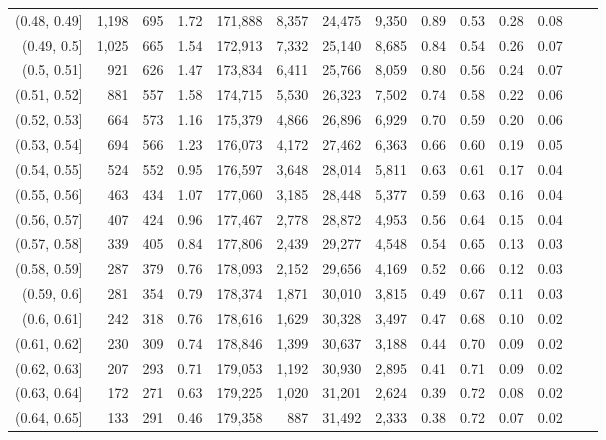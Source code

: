 \begin{tabular}{rrrrrrrrrrrrrr}
(0.48, 0.49]   &  1,198 &  695 &    1.72 &  171,888 &    8,357 &  24,475 &   9,350 &  0.89 &  0.53 &  0.28 &      0.08 \\
(0.49, 0.5]    &  1,025 &  665 &    1.54 &  172,913 &    7,332 &  25,140 &   8,685 &  0.84 &  0.54 &  0.26 &      0.07 \\
(0.5, 0.51]    &    921 &  626 &    1.47 &  173,834 &    6,411 &  25,766 &   8,059 &  0.80 &  0.56 &  0.24 &      0.07 \\
(0.51, 0.52]   &    881 &  557 &    1.58 &  174,715 &    5,530 &  26,323 &   7,502 &  0.74 &  0.58 &  0.22 &      0.06 \\
(0.52, 0.53]   &    664 &  573 &    1.16 &  175,379 &    4,866 &  26,896 &   6,929 &  0.70 &  0.59 &  0.20 &      0.06 \\
(0.53, 0.54]   &    694 &  566 &    1.23 &  176,073 &    4,172 &  27,462 &   6,363 &  0.66 &  0.60 &  0.19 &      0.05 \\
(0.54, 0.55]   &    524 &  552 &    0.95 &  176,597 &    3,648 &  28,014 &   5,811 &  0.63 &  0.61 &  0.17 &      0.04 \\
(0.55, 0.56]   &    463 &  434 &    1.07 &  177,060 &    3,185 &  28,448 &   5,377 &  0.59 &  0.63 &  0.16 &      0.04 \\
(0.56, 0.57]   &    407 &  424 &    0.96 &  177,467 &    2,778 &  28,872 &   4,953 &  0.56 &  0.64 &  0.15 &      0.04 \\
(0.57, 0.58]   &    339 &  405 &    0.84 &  177,806 &    2,439 &  29,277 &   4,548 &  0.54 &  0.65 &  0.13 &      0.03 \\
(0.58, 0.59]   &    287 &  379 &    0.76 &  178,093 &    2,152 &  29,656 &   4,169 &  0.52 &  0.66 &  0.12 &      0.03 \\
(0.59, 0.6]    &    281 &  354 &    0.79 &  178,374 &    1,871 &  30,010 &   3,815 &  0.49 &  0.67 &  0.11 &      0.03 \\
(0.6, 0.61]    &    242 &  318 &    0.76 &  178,616 &    1,629 &  30,328 &   3,497 &  0.47 &  0.68 &  0.10 &      0.02 \\
(0.61, 0.62]   &    230 &  309 &    0.74 &  178,846 &    1,399 &  30,637 &   3,188 &  0.44 &  0.70 &  0.09 &      0.02 \\
(0.62, 0.63]   &    207 &  293 &    0.71 &  179,053 &    1,192 &  30,930 &   2,895 &  0.41 &  0.71 &  0.09 &      0.02 \\
(0.63, 0.64]   &    172 &  271 &    0.63 &  179,225 &    1,020 &  31,201 &   2,624 &  0.39 &  0.72 &  0.08 &      0.02 \\
(0.64, 0.65]   &    133 &  291 &    0.46 &  179,358 &      887 &  31,492 &   2,333 &  0.38 &  0.72 &  0.07 &      0.02 \\

\end{tabular}
